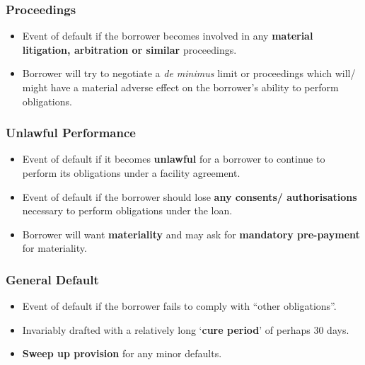 \documentclass[
]{article}
\providecommand{\tightlist}{%
  \setlength{\itemsep}{0pt}\setlength{\parskip}{0pt}}
\begin{document}
\hypertarget{proceedings}{%
\subsubsection{Proceedings}\label{proceedings}}

\begin{itemize}
\tightlist
\item
  Event of default if the borrower becomes involved in any
  \textbf{material litigation, arbitration or similar} proceedings.
\item
  Borrower will try to negotiate a \emph{de minimus} limit or
  proceedings which will/ might have a material adverse effect on the
  borrower's ability to perform obligations.
\end{itemize}

\hypertarget{unlawful-performance}{%
\subsubsection{Unlawful Performance}\label{unlawful-performance}}

\begin{itemize}
\tightlist
\item
  Event of default if it becomes \textbf{unlawful} for a borrower to
  continue to perform its obligations under a facility agreement.
\item
  Event of default if the borrower should lose \textbf{any consents/
  authorisations} necessary to perform obligations under the loan.
\item
  Borrower will want \textbf{materiality} and may ask for
  \textbf{mandatory pre-payment} for materiality.
\end{itemize}

\hypertarget{general-default}{%
\subsubsection{General Default}\label{general-default}}

\begin{itemize}
\tightlist
\item
  Event of default if the borrower fails to comply with ``other
  obligations''.
\item
  Invariably drafted with a relatively long `\textbf{cure period}' of
  perhaps 30 days.
\item
  \textbf{Sweep up provision} for any minor defaults.
\end{itemize}
\end{document}
